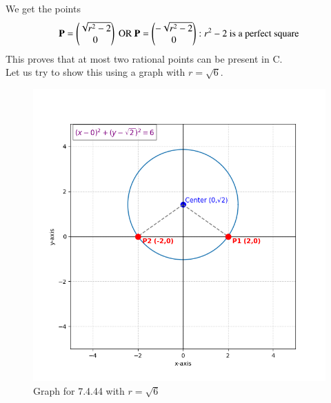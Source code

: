 \documentclass[journal,12pt,onecolumn]{IEEEtran}
\theoremstyle{remark}
\begin{document}
We get the points 
\begin{align}
    \mathbf{P}=\begin{pmatrix}\sqrt{r^2 - 2}\\0\end{pmatrix} \text{ OR } \mathbf{P} = \begin{pmatrix}-\sqrt{r^2 - 2}\\0\end{pmatrix} : r^2 - 2 \text{ is a perfect square} 
\end{align}
This proves that at most two rational points can be present in C.\\
Let us try to show this using a graph with $r=\sqrt{6}$.
\begin{figure}[H]
    \centering
    \includegraphics[width=1\columnwidth]{figs/1.png}
    \caption{Graph for 7.4.44 with $r= \sqrt{6}$}
    \label{fig:placeholder}
\end{figure}
\end{document}
